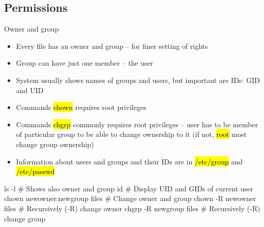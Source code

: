 \documentclass[compress, ucs, xelatex, 11pt, xcolor=svgnames,
  hyperref={
    bookmarks=true,
    unicode=true,
    colorlinks=true,
    pdftitle={Linux, command line and MetaCentrum},
    plainpages=false,
    pdfauthor={Vojtech Zeisek},
    pdfsubject={Course about use of Linux command line, writing shell scripts and using MetaCentrum of CESNET},
    pdfcreator={XeLaTeX},
    pdfkeywords={Linux, GNU, BASH, shell, command line, MetaCentrum},
    linkcolor=DarkRed,
    anchorcolor=DarkBlue,
    citecolor=Indigo,
    filecolor=NavyBlue,
    menucolor=DarkMagenta,
    urlcolor=DarkBlue,
    pdftex},
  url={hyphens, lowtilde} %
  ]{beamer}
\renewcommand{\texttt}[1]{\hl{\ttfamily #1}}
\begin{document}
\subsection{Permissions}

\begin{frame}[fragile]{Owner and group}
  \begin{itemize}
    \item Every file has an owner and group -- for finer setting of rights
    \item Group can have just one member -- the user
    \item System usually shows names of groups and users, but important are IDs: GID and UID
    \item Commands \texttt{chown} requires root privileges
    \item Commands \texttt{chgrp} commonly requires root privileges -- user has to be member of particular group to be able to change ownership to it (if not, \texttt{root} most change group ownership)
    \item Information about users and groups and their IDs are in \texttt{/etc/group} and \texttt{/etc/passwd}
  \end{itemize}
  \begin{bashcode}
    ls -l # Shows also owner and group
    id # Display UID and GIDs of current user
    chown newowner:newgroup files # Change owner and group
    chown -R newowner files # Recursively (-R) change owner
    chgrp -R newgroup files # Recursively (-R) change group
  \end{bashcode}
\end{frame}
\end{document}
